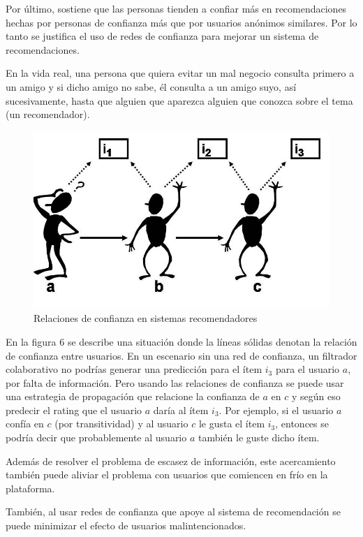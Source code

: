 Por último, \cite{Victor} sostiene que las personas tienden a confiar más en recomendaciones hechas por personas de confianza más que por usuarios anónimos similares. Por lo tanto se justifica el uso de redes de confianza para mejorar un sistema de recomendaciones.

En la vida real, una persona que quiera evitar un mal negocio consulta primero a un amigo y si dicho amigo no sabe, él consulta a un amigo suyo, así sucesivamente, hasta que alguien que aparezca alguien que conozca sobre el tema (un recomendador).  

\begin{figure}[hbtp]
\centering
\includegraphics[scale=0.3]{images/trustrec.png}
\caption{Relaciones de confianza en sistemas recomendadores}
\end{figure}

En la figura 6 se describe una situación donde la líneas sólidas denotan la relación de confianza entre usuarios. En un escenario sin una red de confianza, un filtrador colaborativo no podrías generar una predicción para el ítem $i_3$ para el usuario $a$, por falta de información. Pero usando las relaciones de confianza se puede usar una estrategia de propagación que relacione la confianza de $a$ en $c$ y según eso predecir el rating que el usuario $a$ daría al ítem $i_3$. Por ejemplo, si el usuario $a$ confía en $c$ (por transitividad) y al usuario $c$ le gusta el ítem $i_3$, entonces se podría decir que probablemente al usuario $a$ también le guste dicho ítem.

Además de resolver el problema de escasez de información, este acercamiento también puede aliviar el problema con usuarios que comiencen en frío en la plataforma. 

También, al usar redes de confianza que apoye al sistema de recomendación se puede minimizar el efecto de usuarios malintencionados.

